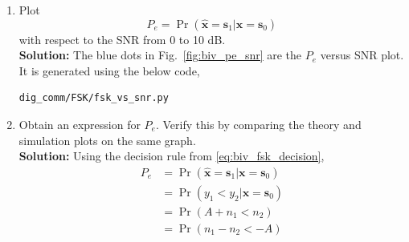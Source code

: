\documentclass[journal,10pt,twocolumn]{IEEEtran}
\newcommand\figref{Fig.~\ref}
\providecommand{\mbf}{\mathbf}
\providecommand{\pr}[1]{\ensuremath{\Pr\left(#1\right)}}
\providecommand{\brak}[1]{\ensuremath{\left(#1\right)}}
\providecommand{\norm}[1]{\left\lVert#1\right\rVert}
\newcommand{\solution}{\noindent \textbf{Solution: }}
\newcommand{\myvec}[1]{\ensuremath{\begin{pmatrix}#1\end{pmatrix}}}
\providecommand{\gauss}[2]{\mathcal{N}\ensuremath{\left(#1,#2\right)}}
\let\vec\mathbf
\begin{document}
\begin{enumerate}
\begin{multline*}
	\implies \exp\brak{-\frac{1}{2 \sigma}\brak{\vec{y}-\vec{s}_0}^\top \brak{\vec{y}-\vec{s}_0}} = \\
	\exp\brak{-\frac{1}{2 \sigma}\brak{\vec{y}-\vec{s}_1}^\top \brak{\vec{y}-\vec{s}_1}}
\end{multline*}
	
\begin{align*}
	\implies \brak{\vec{y}-\vec{s}_0}^\top \brak{\vec{y}-\vec{s}_0} &= \brak{\vec{y}-\vec{s}_1}^\top \brak{\vec{y}-\vec{s}_1}\\
	\implies \vec{y}^\top\vec{y} - 2\vec{s}_0^\top \vec{y} + \vec{s}_0^T\vec{s}_0 &= \vec{y}^\top\vec{y} - 2\vec{s}_1^\top \vec{y} + \vec{s}_1^T\vec{s}_1\\
	\implies 2\brak{\vec{s}_1-\vec{s}_0}^\top \vec{y} &= \norm{\vec{s}_1}^2 - \norm{\vec{s}_0}^2\\
	\implies \brak{\vec{s}_1-\vec{s}_0}^\top \vec{y} &= 0\\
	\implies \myvec{-1\\1}^\top \vec{y} &= 0
\end{align*}
%
\item
Plot 
\begin{equation} 
P_e = \pr{\hat{\mbf{x}} = \mbf{s}_1|\mbf{x} = \mbf{s}_0}
\label{eq:prob_error_fsk}
\end{equation}
with respect to the SNR from 0 to 10 dB.\\
\solution The blue dots in \figref{fig:biv_pe_snr} are the $P_e$ versus SNR plot. It is generated using the below code,
\begin{lstlisting}
dig_comm/FSK/fsk_vs_snr.py
\end{lstlisting}
%
\item
Obtain an expression for $P_e$. Verify this by comparing the theory and simulation plots on the same graph.\\
\solution Using the decision rule from \eqref{eq:biv_fsk_decision},
\begin{align}
	\nonumber
	P_e &= \pr{\hat{\mbf{x}} = \mbf{s}_1|\mbf{x} = \mbf{s}_0}\\\nonumber
	&= \pr{y_1 < y_2|\mbf{x} = \mbf{s}_0}\\\nonumber
	&= \pr{A+n_1 < n_2}\\
	\label{eq:prob_error_fsk_inter}
	&= \pr{n_1-n_2 < -A}
\end{align}

\end{enumerate}
\end{document}
